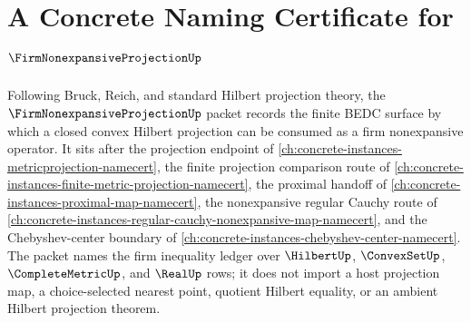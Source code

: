 \chapter{A Concrete Naming Certificate for $\FirmNonexpansiveProjectionUp$}
\label{ch:concrete-instances-firm-nonexpansive-projection-namecert}

Following Bruck, Reich, and standard Hilbert projection theory, the $\FirmNonexpansiveProjectionUp$ packet records the finite BEDC surface by which a closed convex Hilbert projection can be consumed as a firm nonexpansive operator. It sits after the projection endpoint of \autoref{ch:concrete-instances-metricprojection-namecert}, the finite projection comparison route of \autoref{ch:concrete-instances-finite-metric-projection-namecert}, the proximal handoff of \autoref{ch:concrete-instances-proximal-map-namecert}, the nonexpansive regular Cauchy route of \autoref{ch:concrete-instances-regular-cauchy-nonexpansive-map-namecert}, and the Chebyshev-center boundary of \autoref{ch:concrete-instances-chebyshev-center-namecert}. The packet names the firm inequality ledger over $\HilbertUp$, $\ConvexSetUp$, $\CompleteMetricUp$, and $\RealUp$ rows; it does not import a host projection map, a choice-selected nearest point, quotient Hilbert equality, or an ambient Hilbert projection theorem.

